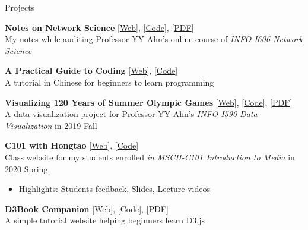 \documentclass{resume}
\begin{document}
\begin{rSection}{Projects}

{\bf Notes on Network Science}{\hspace{2em} [\href{https://netsci.hongtaoh.com/}{Web}], [\href{https://github.com/hongtaoh/netsci-notes}{Code}], 
[\href{https://netsci.hongtaoh.com/netsci.pdf}{PDF}]} \\
My notes while auditing Professor YY Ahn's online course of \href{https://github.com/yy/netsci-course}{\emph{INFO I606 Network Science} }

{\bf A Practical Guide to Coding}{\hspace{2em} [\href{https://intro2code.hongtaoh.com/}{Web}], [\href{https://github.com/hongtaoh/intro2code}{Code}]}\\
A tutorial in Chinese for beginners to learn programming

{\bf Visualizing 120 Years of Summer Olympic Games}{\hspace{2em} [\href{https://olymvis.hongtaoh.com/}{Web}], [\href{https://github.com/hongtaoh/olymvis-data}{Code}],
[\href{https://raw.githubusercontent.com/hongtaoh/olymvis/master/static/tex-pdf/fang_hao_olymvis.pdf}{PDF}]} \\
A data visualization project for Professor YY Ahn's \emph{INFO I590 Data Visualization} in 2019 Fall

{\bf C101 with Hongtao}{ \hspace{2em} [\href{https://c101.hongtaoh.com/}{Web}], [\href{https://github.com/hongtaoh/c101}{Code}]} \\
Class website for my students enrolled \textit{in MSCH-C101 Introduction to Media} in 2020 Spring.\\
\begin{itemize}
  \item[] \vspace{-1.6em} \hspace{-1em}  Highlights: \href{https://c101.hongtaoh.com/feedback/}{Students feedback}, \href{https://c101.hongtaoh.com/slides/}{Slides}, \href{https://c101.hongtaoh.com/videos/}{Lecture videos}
\end{itemize}

{\bf D3Book Companion}{\hspace{2em} [\href{https://d3book.hongtaoh.com/}{Web}], [\href{https://github.com/hongtaoh/d3book}{Code}]},
[\href{https://d3book.hongtaoh.com/d3book.pdf}{PDF}]\\
A simple tutorial website helping beginners learn D3.js


\end{rSection}
\end{document}
